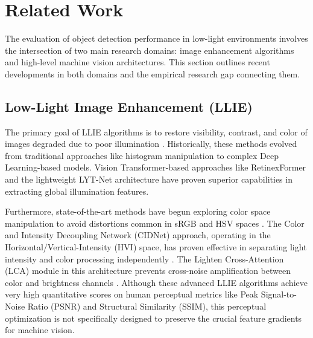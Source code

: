 \documentclass[conference]{IEEEtran}
\begin{document}
\section{Related Work}
The evaluation of object detection performance in low-light environments involves the intersection of two main research domains: image enhancement algorithms and high-level machine vision architectures. This section outlines recent developments in both domains and the empirical research gap connecting them.

\subsection{Low-Light Image Enhancement (LLIE)} The primary goal of LLIE algorithms is to restore visibility, contrast, and color of images degraded due to poor illumination \cite{liu2021benchmark}. Historically, these methods evolved from traditional approaches like histogram manipulation to complex Deep Learning-based models. Vision Transformer-based approaches like RetinexFormer \cite{cai2023retinexformer} and the lightweight LYT-Net architecture \cite{brateanu2025lytnet} have proven superior capabilities in extracting global illumination features.

Furthermore, state-of-the-art methods have begun exploring color space manipulation to avoid distortions common in sRGB and HSV spaces \cite{yan2025hvi}. The Color and Intensity Decoupling Network (CIDNet) approach, operating in the Horizontal/Vertical-Intensity (HVI) space, has proven effective in separating light intensity and color processing independently \cite{yan2025hvi}. The Lighten Cross-Attention (LCA) module in this architecture prevents cross-noise amplification between color and brightness channels \cite{darmawan2025vitra}. Although these advanced LLIE algorithms achieve very high quantitative scores on human perceptual metrics like Peak Signal-to-Noise Ratio (PSNR) and Structural Similarity (SSIM), this perceptual optimization is not specifically designed to preserve the crucial feature gradients for machine vision.
\end{document}
